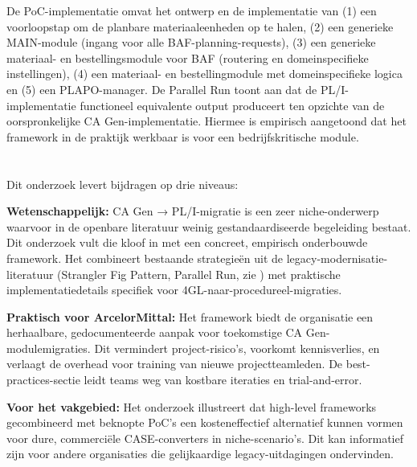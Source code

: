 De PoC-implementatie omvat het ontwerp en de implementatie van (1) een voorloopstap om de planbare materiaaleenheden op te halen, (2) een generieke MAIN-module 
(ingang voor alle BAF-planning-requests), (3) een generieke materiaal- en bestellingsmodule voor BAF (routering en domeinspecifieke 
instellingen), (4) een materiaal- en bestellingmodule met domeinspecifieke logica en (5) een PLAPO-manager. 
De Parallel Run toont aan dat de PL/I-implementatie
functioneel equivalente output produceert ten opzichte van de oorspronkelijke CA Gen-implementatie. Hiermee is
empirisch aangetoond dat het framework in de praktijk werkbaar is voor een bedrijfskritische module.


\section{}%
\label{sec:bijdrage-meerwaarde}

Dit onderzoek levert bijdragen op drie niveaus:

\textbf{Wetenschappelijk:} CA Gen → PL/I-migratie is een zeer niche-onderwerp waarvoor in de openbare literatuur 
weinig gestandaardiseerde begeleiding bestaat. Dit onderzoek vult die kloof in met een concreet, 
empirisch onderbouwde framework. Het combineert bestaande strategieën uit de legacy-modernisatie-literatuur 
(Strangler Fig Pattern, Parallel Run, zie \autocite{Orosz2022}) met praktische implementatiedetails specifiek voor 
4GL-naar-procedureel-migraties.

\textbf{Praktisch voor ArcelorMittal:} Het framework biedt de organisatie een herhaalbare, gedocumenteerde aanpak
voor toekomstige CA Gen-modulemigraties. Dit vermindert project-risico's, voorkomt kennisverlies, en verlaagt 
de overhead voor training van nieuwe projectteamleden. De best-practices-sectie leidt teams weg van kostbare 
iteraties en trial-and-error.

\textbf{Voor het vakgebied:} Het onderzoek illustreert dat high-level frameworks gecombineerd met beknopte PoC's een
kosteneffectief alternatief kunnen vormen voor dure, commerciële CASE-converters in niche-scenario's. Dit kan 
informatief zijn voor andere organisaties die gelijkaardige legacy-uitdagingen ondervinden.

